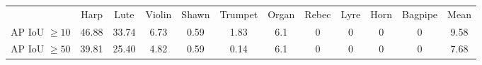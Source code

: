 \begin{tabular}{c|c|c|c|c|c|c|c|c|c|c||c}\hline
		& Harp & Lute & Violin & Shawn & Trumpet  & Organ & Rebec & Lyre & Horn & Bagpipe & Mean\\ 
	AP IoU $\geq10$ &  46.88         &  33.74    &  6.73          &  0.59       & 1.83 & 6.1 & 0 & 0 & 0 & 0 & 9.58  \\
	AP IoU $\geq50$ & 39.81         &  25.40    &  4.82          &  0.59       & 0.14 & 6.1 & 0 & 0 & 0 & 0 & 7.68 
\end{tabular}
